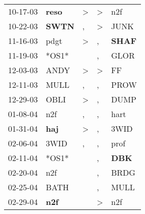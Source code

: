 \begin{supertabular}{p{0.07\textwidth}p{0.06\textwidth}p{0.02\textwidth}p{0.02\textwidth}p{0.06\textwidth}}
          10-17-03\textsuperscript{} &  \textbf{reso\textsuperscript{}} &     \textgreater &     \textgreater &            n2f\textsuperscript{} \\
          10-22-03\textsuperscript{} &  \textbf{SWTN\textsuperscript{}} &                , &     \textgreater &           JUNK\textsuperscript{} \\
          11-16-03\textsuperscript{} &           pdgt\textsuperscript{} &     \textgreater &                , &  \textbf{SHAF\textsuperscript{}} \\
          11-19-03\textsuperscript{} &                            *OS1* &                  &                , &           GLOR\textsuperscript{} \\
          12-03-03\textsuperscript{} &           ANDY\textsuperscript{} &     \textgreater &     \textgreater &             FF\textsuperscript{} \\
          12-11-03\textsuperscript{} &           MULL\textsuperscript{} &                , &                , &           PROW\textsuperscript{} \\
          12-29-03\textsuperscript{} &           OBLI\textsuperscript{} &     \textgreater &                , &           DUMP\textsuperscript{} \\
          01-08-04\textsuperscript{} &            n2f\textsuperscript{} &                , &                , &           hart\textsuperscript{} \\
          01-31-04\textsuperscript{} &   \textbf{haj\textsuperscript{}} &     \textgreater &                , &           3WID\textsuperscript{} \\
          02-06-04\textsuperscript{} &           3WID\textsuperscript{} &                , &                , &           prof\textsuperscript{} \\
          02-11-04\textsuperscript{} &                            *OS1* &                  &                , &   \textbf{DBK\textsuperscript{}} \\
          02-20-04\textsuperscript{} &            n2f\textsuperscript{} &                  &                , &           BRDG\textsuperscript{} \\
          02-25-04\textsuperscript{} &           BATH\textsuperscript{} &                  &                , &           MULL\textsuperscript{} \\
          02-29-04\textsuperscript{} &   \textbf{n2f\textsuperscript{}} &                  &     \textgreater &            n2f\textsuperscript{} \\

\end{supertabular}
